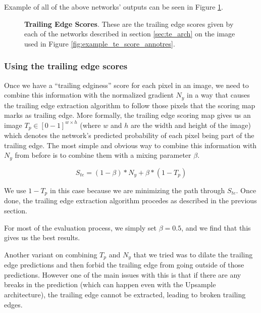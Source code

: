 Example of all of the above networks' outputs can be seen in Figure \ref{fig:example_te_scores_all}.


\begin{figure}[t]%
\centering
{}
\newline
{}
\caption[]{\textbf{Trailing Edge Scores}. These are the trailing edge scores given by each of the networks described in section \ref{sec:te_arch} on the image used in Figure \ref{fig:example_te_score_annotres}.}
\label{fig:example_te_scores_all}
\end{figure}

\subsubsection{Using the trailing edge scores}

Once we have a ``trailing edginess'' score for each pixel in an image, we need to combine this information with the normalized gradient $N_y$ in a way that causes the trailing edge extraction algorithm to follow those pixels that the scoring map marks as trailing edge.
More formally, the trailing edge scoring map gives us an image $T_p \in [0-1]^{w \times h}$ (where $w$ and $h$ are the width and height of the image) which denotes the network's predicted probability of each pixel being part of the trailing edge.
The most simple and obvious way to combine this information with $N_y$ from before is to combine them with a mixing parameter $\beta$.

\begin{equation}
S_{te} = (1 - \beta)*N_y + \beta*(1 - T_p)
\end{equation}

We use $1 - T_p$ in this case because we are minimizing the path through $S_{te}$.
Once done, the trailing edge extraction algorithm procedes as described in the previous section.

For most of the evaluation process, we simply set $\beta = 0.5$, and we find that this gives us the best results.

Another variant on combining $T_p$ and $N_y$ that we tried was to dilate the trailing edge predictions and then forbid the trailing edge from going outside of those predictions.
However one of the main issues with this is that if there are any breaks in the prediction (which can happen even with the Upsample architecture), the trailing edge cannot be extracted, leading to broken trailing edges.

